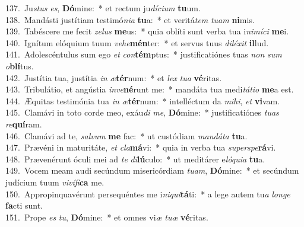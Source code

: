 {137.~}Ju\textit{stus} \textit{es}, \textbf{Dó}mine:~* et rectum ju\textit{dí}\textit{ci}\textit{um} \textbf{tu}um.\\
{138.~}Mandásti justítiam testimó\textit{ni}\textit{a} \textbf{tu}a:~* et veritá\textit{tem} \textit{tu}\textit{am} \textbf{ni}mis.\\
{139.~}Tabéscere me fecit \textit{ze}\textit{lus} \textbf{me}us:~* quia oblíti sunt verba tua i\textit{ni}\textit{mí}\textit{ci} \textbf{me}i.\\
{140.~}Ignítum elóquium tuum \textit{ve}\textit{he}\textbf{mén}ter:~* et servus tuus \textit{di}\textit{lé}\textit{xit} \textbf{il}lud.\\
{141.~}Adolescéntulus sum ego \textit{et} \textit{con}\textbf{tém}ptus:~* justificatiónes tuas \textit{non} \textit{sum} \textit{o}\textbf{blí}tus.\\
{142.~}Justítia tua, justítia \textit{in} \textit{æ}\textbf{tér}num:~* et \textit{lex} \textit{tu}\textit{a} \textbf{vé}ritas.\\
{143.~}Tribulátio, et angústia \textit{in}\textit{ve}\textbf{né}runt me:~* mandáta tua medi\textit{tá}\textit{ti}\textit{o} \textbf{me}a est.\\
{144.~}Æquitas testimónia tua \textit{in} \textit{æ}\textbf{tér}num:~* intelléctum da \textit{mi}\textit{hi}, \textit{et} \textbf{vi}vam.\\
{145.~}Clamávi in toto corde meo, exáu\textit{di} \textit{me}, \textbf{Dó}mine:~* justificatiónes \textit{tu}\textit{as} \textit{re}\textbf{quí}ram.\\
{146.~}Clamávi ad te, \textit{sal}\textit{vum} \textbf{me} fac:~* ut custódiam \textit{man}\textit{dá}\textit{ta} \textbf{tu}a.\\
{147.~}Prævéni in maturitáte, \textit{et} \textit{cla}\textbf{má}vi:~* quia in verba tua \textit{su}\textit{per}\textit{spe}\textbf{rá}vi.\\
{148.~}Prævenérunt óculi mei ad \textit{te} \textit{di}\textbf{lú}culo:~* ut meditárer e\textit{ló}\textit{qui}\textit{a} \textbf{tu}a.\\
{149.~}Vocem meam audi secúndum misericórdiam \textit{tu}\textit{am}, \textbf{Dó}mine:~* et secúndum judícium tuum \textit{vi}\textit{ví}\textit{fi}\textbf{ca} me.\\
{150.~}Appropinquavérunt persequéntes me i\textit{ni}\textit{qui}\textbf{tá}ti:~* a lege autem tu\textit{a} \textit{lon}\textit{ge} \textbf{fa}cti sunt.\\
{151.~}Prope \textit{es} \textit{tu}, \textbf{Dó}mine:~* et omnes vi\textit{æ} \textit{tu}\textit{æ} \textbf{vé}ritas.\\
